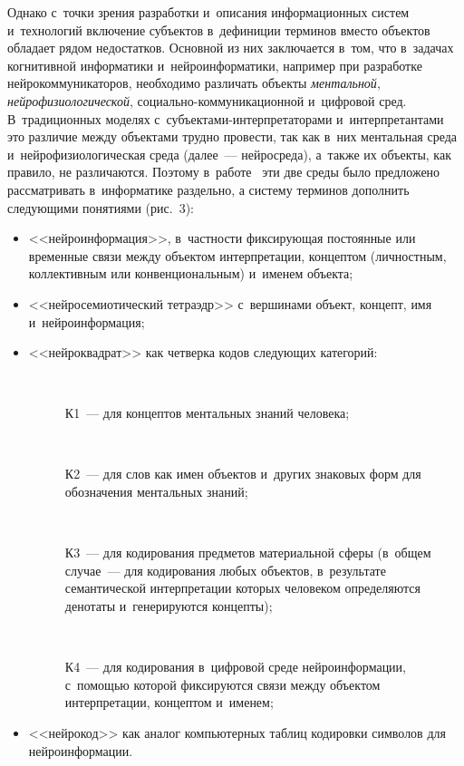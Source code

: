 {\begin{multicols}{2}
      Однако с~точки зрения разработки и~описания информационных систем и~технологий 
включение субъектов в~дефиниции терминов вместо объектов обладает рядом недостатков. 
Основной из них заключа\-ется в~том, что в~задачах когнитивной информатики 
и~нейроинформатики, например при разработке нейрокоммуникаторов, необходимо 
различать объекты \textit{ментальной}, \textit{нейрофизиологической}, 
со\-ци\-аль\-но-ком\-му\-ни\-ка\-ци\-он\-ной и~цифровой сред. В~традиционных моделях 
с~субъек\-та\-ми-ин\-тер\-пре\-та\-то\-ра\-ми и~интерпретантами это различие между объектами трудно 
провести, так как в~них ментальная среда и~нейрофизиологическая среда (далее~--- 
нейросреда), а~также их объекты, как правило, не различаются. Поэтому 
      в~работе~\cite{12-zat} эти две среды было предложено рассматривать в~информатике 
раздельно, а систему терминов дополнить следующими понятиями (рис.~3):
      \begin{itemize}
\item <<нейроинформация>>, в~частности фик\-си\-ру\-ющая постоянные или 
временные связи между объектом интерпретации, концептом (личностным, 
коллективным или конвенциональным) и~именем объекта;
\item <<нейросемиотический тетраэдр>> с~вершинами объект, концепт, имя 
и~нейроинформация;
\item <<нейроквадрат>> как четверка кодов следующих категорий:
\begin{description}
\item[\,] К1~--- для концептов ментальных знаний человека;
\item[\,] К2~--- для слов как имен объектов и~других знаковых форм для 
обозначения ментальных знаний;
\item[\,] К3~--- для кодирования предметов матери\-альной сферы (в~общем 
случае~--- для кодирования любых объектов, в~результате семантиче\-ской 
интерпретации которых человеком определяются денотаты и~генерируются 
концепты);
\item[\,] К4~--- для кодирования в~цифровой среде нейроинформации,  
с~по\-мощью которой фиксируются связи между объектом интерпретации, 
концептом и~именем;
\end{description}
\item <<нейрокод>> как аналог компьютерных таблиц кодировки символов для 
нейроинформации.
\end{itemize}


\end{multicols}}
